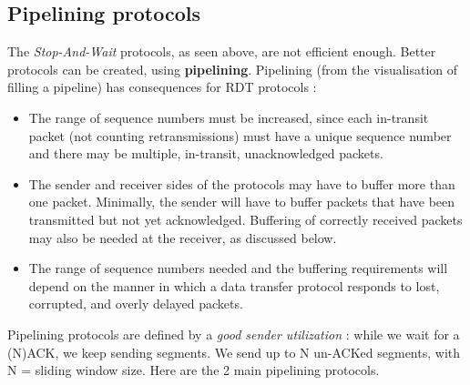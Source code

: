 \documentclass[12pt,a4paper]{article}
\begin{document}
\subsection{Pipelining protocols}
The \textit{Stop-And-Wait} protocols, as seen above, are not efficient enough. Better protocols can be created, using \textbf{pipelining}. Pipelining (from the visualisation of filling a pipeline) has consequences for RDT protocols :
\begin{itemize}
	\item 	The range of sequence numbers must be increased, since each in-transit packet (not counting retransmissions) must have a unique sequence number and there may be multiple, in-transit, unacknowledged packets.
	\item 	The sender and receiver sides of the protocols may have to buffer more than one packet. Minimally, the sender will have to buffer packets that have been transmitted but not yet acknowledged. Buffering of correctly received packets may also be needed at the receiver, as discussed below.
	\item 	The range of sequence numbers needed and the buffering requirements will depend on the manner in which a data transfer protocol responds to lost, corrupted, and overly delayed packets.
\end{itemize}
Pipelining protocols are defined by a \textit{good sender utilization} : while we wait for a (N)ACK, we keep sending segments. We send up to N un-ACKed segments, with N = sliding window size.
Here are the 2 main pipelining protocols.
\end{document}
